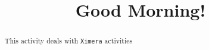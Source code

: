\documentclass{ximera}
\title{Good Morning!}
\begin{document}
\begin{abstract}
This activity deals with \verb!Ximera! activities
\end{abstract}
\maketitle
\end{document}
